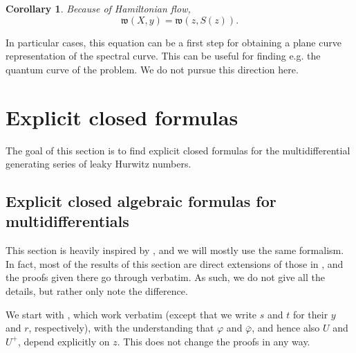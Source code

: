 \documentclass[10pt,a4paper,oneside,no-math,reqno]{amsart}%
\theoremstyle{plain}
\newtheorem{corollary}[theorem]{Corollary}
\theoremstyle{definition}
\newtheorem{definition}[theorem]{Definition}
\theoremstyle{remark}
\numberwithin{equation}{section}
\renewcommand{\phi}{\varphi}
\newcommand{\mf}[1]{\mathfrak{#1}}
\newcommand{\mc}[1]{\mathcal{#1}}
\newcommand{\1}{\mathds{1}}
\newcommand{\<}{\langle}
\renewcommand{\>}{\rangle}
\newcommand{\del}{\partial}
\begin{document}
\begin{corollary}
	Because of Hamiltonian flow,
	\begin{equation}
		\mf{w}( X, y) 
		= 
		\mf{w} (z, S(z)) .
	\end{equation}
\end{corollary}

In particular cases, this equation can be a first step for obtaining a plane curve representation of the spectral curve. This can be useful for finding e.g. the quantum curve of the problem. We do not pursue this direction here.




\section{Explicit closed formulas }
\label{ExplicitSection}

The goal of this section is to find explicit closed formulas for the multidifferential generating series of leaky Hurwitz numbers. 

\subsection{Explicit closed algebraic formulas for multidifferentials}
\label{ExplicitMultidifferentials}

This section is heavily inspired by \cite{BDKS22}, and we will mostly use the same formalism. In fact, most of the results of this section are direct extensions of those in \cite{BDKS22}, and the proofs given there go through verbatim. As such, we do not give all the details, but rather only note the difference.

We start with \cite[Sections 3 \& 4.1-2]{BDKS22}, which work verbatim (except that we write $ s $ and $t$ for their $ y$ and $ r$, respectively),  with the understanding that $ \phi$ and $ \bar{\phi}$, and hence also $ U $ and $U^+$, depend explicitly on $z$. This does not change the proofs in any way.

\end{document}
